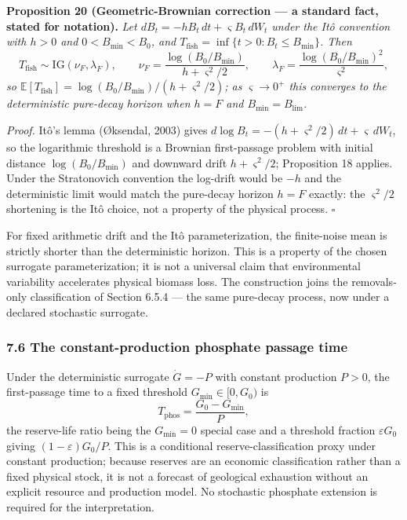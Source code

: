 \documentclass[11pt]{article}
\begin{document}
\textbf{Proposition 20 (Geometric-Brownian correction --- a standard
fact, stated for notation).} \emph{Let
\(dB_t = -hB_t\, dt + \varsigma B_t\, dW_t\) under the It\^o convention
with \(h > 0\) and \(0 < B_{\min} < B_0\), and
\(T_{\mathrm{fish}} = \inf\{ t > 0 : B_t \le B_{\min} \}\). Then}
\[T_{\mathrm{fish}} \sim \mathrm{IG}(\nu_F, \lambda_F), \qquad \nu_F = \frac{\log(B_0/B_{\min})}{h + \varsigma^2/2}, \qquad \lambda_F = \frac{\log(B_0/B_{\min})^2}{\varsigma^2},\]
\emph{so
\(\mathbb{E}[T_{\mathrm{fish}}] = \log(B_0/B_{\min})/(h + \varsigma^2/2)\);
as \(\varsigma \to 0^+\) this converges to the deterministic pure-decay
horizon when \(h = F\) and \(B_{\min} = B_{\lim}\).}

\emph{Proof.} It\^o's lemma (\O{}ksendal, 2003) gives
\(d\log B_t = -(h + \varsigma^2/2)\, dt + \varsigma\, dW_t\), so the
logarithmic threshold is a Brownian first-passage problem with initial
distance \(\log(B_0/B_{\min})\) and downward drift
\(h + \varsigma^2/2\); Proposition 18 applies. Under the Stratonovich
convention the log-drift would be \(-h\) and the deterministic limit
would match the pure-decay horizon \(h = F\) exactly: the
\(\varsigma^2/2\) shortening is the It\^o choice, not a property of the
physical process. \ensuremath{\square}

For fixed arithmetic drift and the It\^o parameterization, the
finite-noise mean is strictly shorter than the deterministic horizon.
This is a property of the chosen surrogate parameterization; it is not a
universal claim that environmental variability accelerates physical
biomass loss. The construction joins the removals-only classification of
Section 6.5.4 --- the same pure-decay process, now under a declared
stochastic surrogate.

\subsubsection{7.6 The constant-production phosphate passage
time}\label{the-constant-production-phosphate-passage-time}

Under the deterministic surrogate \(\dot G = -P\) with constant
production \(P > 0\), the first-passage time to a fixed threshold
\(G_{\min} \in [0, G_0)\) is
\[T_{\mathrm{phos}} = \frac{G_0 - G_{\min}}{P},\] the reserve-life ratio
being the \(G_{\min} = 0\) special case and a threshold fraction
\(\varepsilon G_0\) giving \((1-\varepsilon)G_0/P\). This is a
conditional reserve-classification proxy under constant production;
because reserves are an economic classification rather than a fixed
physical stock, it is not a forecast of geological exhaustion without an
explicit resource and production model. No stochastic phosphate
extension is required for the interpretation.
\end{document}
